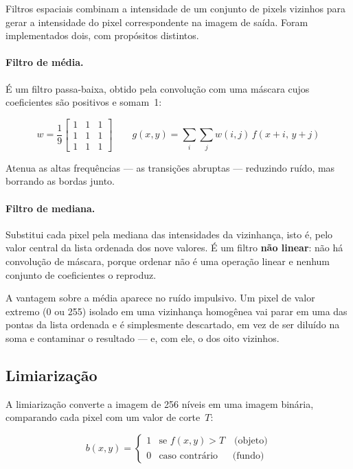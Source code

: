 \documentclass[12pt,a4paper]{article}
\begin{document}
Filtros espaciais combinam a intensidade de um conjunto de pixels vizinhos
para gerar a intensidade do pixel correspondente na imagem de saída. Foram
implementados dois, com propósitos distintos.

\paragraph{Filtro de média.} É um filtro passa-baixa, obtido pela convolução
com uma máscara cujos coeficientes são positivos e somam~1:

\begin{equation}
w = \frac{1}{9}
\begin{bmatrix}
1 & 1 & 1 \\
1 & 1 & 1 \\
1 & 1 & 1
\end{bmatrix}
\qquad
g(x,y) = \sum_{i}\sum_{j} w(i,j)\, f(x+i,\, y+j)
\end{equation}

Atenua as altas frequências --- as transições abruptas --- reduzindo ruído,
mas borrando as bordas junto.

\paragraph{Filtro de mediana.} Substitui cada pixel pela mediana das
intensidades da vizinhança, isto é, pelo valor central da lista ordenada dos
nove valores. É um filtro \textbf{não linear}: não há convolução de máscara,
porque ordenar não é uma operação linear e nenhum conjunto de coeficientes o
reproduz.

A vantagem sobre a média aparece no ruído impulsivo. Um pixel de valor extremo
(0 ou 255) isolado em uma vizinhança homogênea vai parar em uma das pontas da
lista ordenada e é simplesmente descartado, em vez de ser diluído na soma e
contaminar o resultado --- e, com ele, o dos oito vizinhos.

\subsection{Limiarização}

A limiarização converte a imagem de 256 níveis em uma imagem binária,
comparando cada pixel com um valor de corte~$T$:

\begin{equation}
b(x,y) =
\begin{cases}
1 & \text{se } f(x,y) > T \quad \text{(objeto)} \\
0 & \text{caso contrário} \quad\;\; \text{(fundo)}
\end{cases}
\end{equation}
\end{document}
